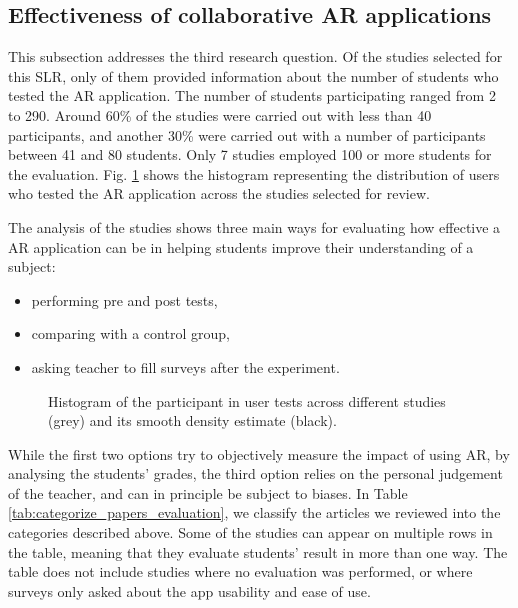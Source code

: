 \subsection{Effectiveness of collaborative AR applications}

This subsection addresses the third research question. Of the \papersSelected studies selected for this \gls{SLR}, only \papersWithNumStudentInfo of them provided information about the number of students who tested the AR application. The number of students participating ranged from 2 to 290. Around 60\% of the studies were carried out with less than 40 participants, and another 30\% were carried out with a number of participants between 41 and 80 students. Only 7 studies employed 100 or more students for the evaluation. Fig. \ref{fig:testers} shows the histogram representing the distribution of users who tested the \gls{AR} application across the studies selected for review.

The analysis of the studies shows three main ways for evaluating how effective a \gls{AR} application can be in helping students improve their understanding of a subject:
\begin{itemize}
    \item performing pre and post tests,
    \item comparing with a control group,
    \item asking teacher to fill surveys after the experiment.
\end{itemize}

\begin{figure}[ht]	
	\begin{center}
	
	\caption{Histogram of the participant in user tests across different studies (grey) and its smooth density estimate (black).}
	\label{fig:testers}
    \end{center}
\end{figure}

While the first two options try to objectively measure the impact of using \gls{AR}, by analysing the students' grades, the third option relies on the personal judgement of the teacher, and can in principle be subject to biases.
In Table \ref{tab:categorize_papers_evaluation}, we classify the \papersSelected articles we reviewed into the categories described above. Some of the studies can appear on multiple rows in the table, meaning that they evaluate students' result in more than one way. The table does not include studies where no evaluation was performed, or where surveys only asked about the app usability and ease of use.

